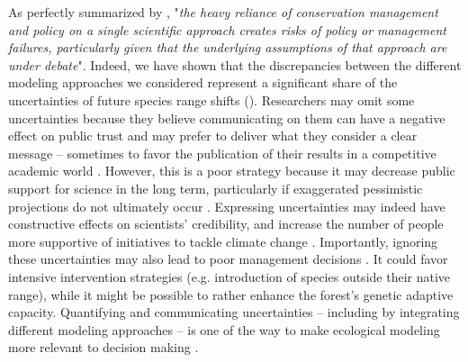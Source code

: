 As perfectly summarized by \citet{Dawson2011}, "\emph{the heavy reliance of conservation management and policy on a single scientific approach creates risks of policy or management failures, particularly given that the underlying assumptions of that approach are under debate}". Indeed, we have shown that the discrepancies between the different modeling approaches we considered represent a significant share of the uncertainties of future species range shifts (). Researchers may omit some uncertainties because they believe communicating on them can have a negative effect on public trust \citep{Howe2019, Simmonds2024} and may prefer to deliver what they consider a clear message -- sometimes to favor the publication of their results in a competitive academic world \citep{Yao2023}. However, this is a poor strategy because it may decrease public support for science in the long term, particularly if exaggerated pessimistic projections do not ultimately occur \citep{Kreps2020}. Expressing uncertainties may indeed have constructive effects on scientists' credibility, and increase the number of people more supportive of initiatives to tackle climate change \citep{Howe2019}. Importantly, ignoring these uncertainties may also lead to poor management decisions \citep{Simmonds2024}. It could favor intensive intervention strategies (e.g. introduction of species outside their native range), while it might be possible to rather enhance the forest's genetic adaptive capacity. Quantifying and communicating uncertainties -- including by integrating different modeling approaches -- is one of the way to make ecological modeling more relevant to decision making \citep{Dietze2017, Saltelli2020}. 

